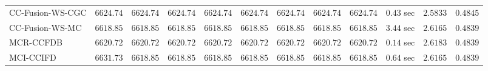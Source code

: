 \begin{table}[H]
\begin{tabular}{lrrrrrrrrrrr}
    CC-Fusion-WS-CGC & $      6624.74$ & $      6624.74$ & $      6624.74$ & $      6624.74$ & $      6624.74$ & $      6624.74$ & $      6624.74$ & $      6624.74$ & $         0.43$ sec    & $       2.5833$  & $       0.4845$ \\ 
     CC-Fusion-WS-MC & $      6618.85$ & $      6618.85$ & $      6618.85$ & $      6618.85$ & $      6618.85$ & $      6618.85$ & $      6618.85$ & $      6618.85$ & $         3.44$ sec    & $       2.6165$  & $       0.4839$ \\ 
\cmidrule{1-1} 
           MCR-CCFDB & $      6620.72$ & $      6620.72$ & $      6620.72$ & $      6620.72$ & $      6620.72$ & $      6620.72$ & $      6620.72$ & $      6620.72$ & $         0.14$ sec    & $       2.6183$  & $       0.4839$ \\ 
\cmidrule{1-1} 
           MCI-CCIFD & $      6631.73$ & $      6618.85$ & $      6618.85$ & $      6618.85$ & $      6618.85$ & $      6618.85$ & $      6618.85$ & $      6618.85$ & $         0.64$ sec    & $       2.6165$  & $       0.4839$ \\ 
\bottomrule
\end{tabular}
\end{table}

